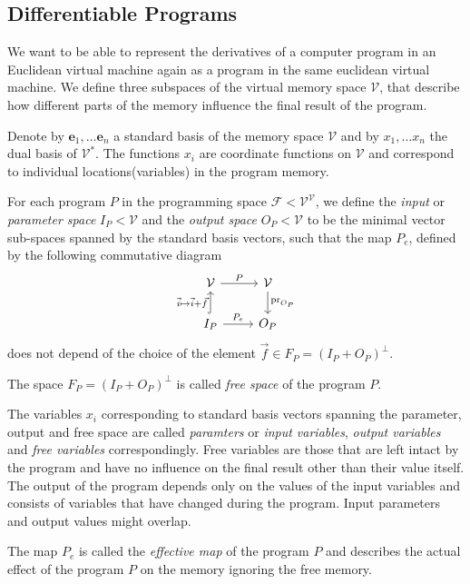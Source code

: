 \documentclass[11pt]{article}
\newcommand{\VV}{\mathcal{V}}
\newcommand{\e}{\mathbf{e}}
\newcommand{\F}{\mathcal{F}}
\begin{document}
\subsection{Differentiable Programs}
We want to be able to represent the derivatives of a computer program in an
Euclidean virtual machine again as a program in the same euclidean virtual
machine. We define three subspaces of the virtual memory space $\VV$, that
describe how different parts of the memory influence the final result of the
program.   

Denote by $\e_1,\ldots \e_n$ a standard basis of the memory space $\VV$ and by
$x_1,\ldots x_n$ the dual basis of $\VV^*$. The functions $x_i$ are coordinate
functions on $\VV$ and correspond to individual locations(variables) in the
program memory.

\begin{definition}
  For each program $P$ in the programming space $\F<\VV^\VV$,
  we define the \emph{input} or \emph{parameter space} $I_P<\VV$ and the
  \emph{output space} $O_P<\VV$ to be the minimal vector sub-spaces spanned by
  the standard basis vectors, such that the map $P_e$, defined by the following
  commutative diagram 
\begin{equation} 
    \label{eq:induced_map}
\begin{tikzcd}
  \VV \arrow{r}{P} & 
  \VV \arrow{d}{\mathrm{pr}_{O_P}}\\
  I_P \arrow[hook]{u}{\vec{i}\mapsto \vec{i}+\vec{f}} 
  \arrow{r}{P_e}& O_P
\end{tikzcd}
  \end{equation}
does not depend of the choice of the element 
$\vec{f}\in F_P=(I_P+O_P)^\perp$.

The space $F_P=(I_P+O_P)^\perp$ is called \emph{free space} of the program $P$.
\end{definition}

The variables $x_i$ corresponding to standard
basis vectors spanning the parameter, output and free space are called
\emph{paramters} or \emph{input variables}, \emph{output variables} and
\emph{free variables} correspondingly. Free variables are those that are
left intact by the program and have no influence on the final result other than
their value itself. The output of the program depends only on the values
of the input variables and consists of variables that have changed during
the program. Input parameters and output values might overlap. 

The map $P_e$ is called the \emph{effective map} of the program $P$ and
describes the actual effect of the program $P$ on the memory
ignoring the free memory. 
\end{document}
